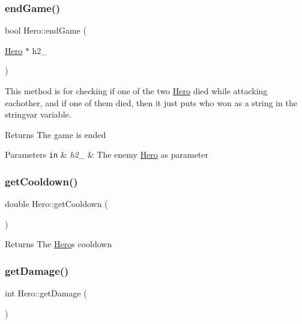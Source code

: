 \subsubsection{\texorpdfstring{end\+Game()}{endGame()}}
{\footnotesize\ttfamily bool Hero\+::end\+Game (\begin{DoxyParamCaption}\item[{\hyperlink{classHero}{Hero} $\ast$}]{h2\+\_\+ }\end{DoxyParamCaption})}



This method is for checking if one of the two \hyperlink{classHero}{Hero} died while attacking eachother, and if one of them died, then it just puts who won as a string in the stringvar variable. 

\begin{DoxyReturn}{Returns}
The game is ended 
\end{DoxyReturn}

\begin{DoxyParams}[1]{Parameters}
\mbox{\tt in}  & {\em h2\+\_\+} & The enemy \hyperlink{classHero}{Hero} as parameter \\
\hline
\end{DoxyParams}
\mbox{\label{classHero_a9e675f767e7cccdc090403913cd7d270}} 
\subsubsection{\texorpdfstring{get\+Cooldown()}{getCooldown()}}
{\footnotesize\ttfamily double Hero\+::get\+Cooldown (\begin{DoxyParamCaption}{ }\end{DoxyParamCaption})}

\begin{DoxyReturn}{Returns}
The \hyperlink{classHero}{Hero}\textquotesingle{}s cooldown 
\end{DoxyReturn}
\mbox{\label{classHero_a4a681c061ac4ce4d1cd22aeb025c8d2e}} 
\subsubsection{\texorpdfstring{get\+Damage()}{getDamage()}}
{\footnotesize\ttfamily int Hero\+::get\+Damage (\begin{DoxyParamCaption}{ }\end{DoxyParamCaption})}

